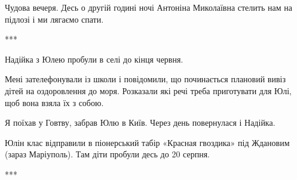 Чудова вечеря. Десь о другій годині ночі Антоніна Миколаївна стелить нам на
підлозі і ми лягаємо спати.

***

Надійка з Юлею пробули в селі до кінця червня. 

Мені зателефонували із школи і повідомили, що починається плановий вивіз дітей
на оздоровлення до моря. Розказали які речі треба приготувати для Юлі, щоб вона
взяла їх з собою.

Я поїхав у Говтву, забрав Юлю в Київ. Через день повернулася і Надійка. 

Юлін клас відправили в піонерський табір «Красная гвоздика» під Ждановим (зараз
Маріуполь). Там діти пробули десь до 20 серпня.

***
